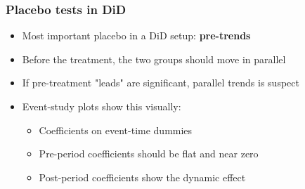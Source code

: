 \begin{frame}
\frametitle{Placebo tests in DiD}
\centering

\begin{itemize}[<+->]
\item Most important placebo in a DiD setup: \textbf{pre-trends}
\item Before the treatment, the two groups should move in parallel
\item If pre-treatment "leads" are significant, parallel trends is suspect
\vspace{10pt}
\item Event-study plots show this visually:
  \begin{itemize}
  \item Coefficients on event-time dummies
  \item Pre-period coefficients should be flat and near zero
  \item Post-period coefficients show the dynamic effect
  \end{itemize}
\end{itemize}

\end{frame}

